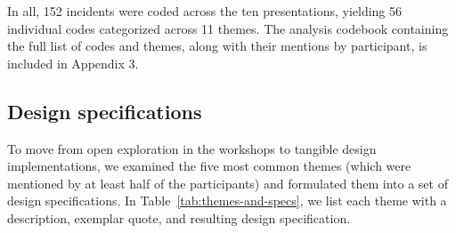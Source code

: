 \documentclass[letterpaper, 12pt]{article}
\begin{document}

In all, 152 incidents were coded across the ten presentations, yielding 56 individual codes categorized across 11 themes. The analysis codebook containing the full list of codes and themes, along with their mentions by participant, is included in Appendix 3. 

\subsection{Design specifications}
\label{ch3-sec:design-specifications}

To move from open exploration in the workshops to tangible design implementations, we examined the five most common themes (which were mentioned by at least half of the participants) and formulated them into a set of design specifications. In Table~\ref{tab:themes-and-specs}, we list each theme with a description, exemplar quote, and resulting design specification. 
\end{document}
